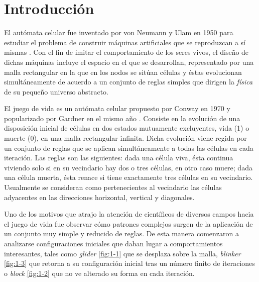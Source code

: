 \documentclass[../proyecto.tex]{book}
\begin{document}
\chapter{Introducción}

El autómata celular fue inventado por von Neumann y Ulam en 1950 para estudiar el problema de construir máquinas artificiales que se reproduzcan a sí mismas \cite{neummanUlam}. Con el fin de imitar el comportamiento de los seres vivos, el diseño de dichas máquinas incluye el espacio en el que se desarrollan, representado por una malla rectangular en la que en los nodos se sitúan células y éstas evolucionan simultáneamente de acuerdo a un conjunto de reglas simples que dirigen la \textit{física} de su pequeño universo abstracto. 

El juego de vida es un autómata celular propuesto por Conway en 1970 y popularizado por Gardner en el mismo año \cite{primerap}. Consiste en la evolución de una disposición inicial de células en dos estados mutuamente excluyentes, vida (1) o muerte (0), en una malla rectangular infinita. Dicha evolución viene regida por un conjunto de reglas que se aplican simultáneamente a todas las células en cada iteración. Las reglas son las siguientes: dada una célula viva, ésta continua viviendo solo si en su vecindario hay dos o tres células, en otro caso muere; dada una célula muerta, ésta renace si tiene exactamente tres células en su vecindario. Usualmente se consideran como pertenecientes al vecindario las células adyacentes en las direcciones horizontal, vertical y diagonales.

Uno de los motivos que atrajo la atención de científicos de diversos campos hacia el juego de vida fue observar cómo patrones complejos surgen de la aplicación de un conjunto muy simple y reducido de reglas. De esta manera comenzaron a analizarse configuraciones iniciales que daban lugar a comportamientos interesantes, tales como \textit{glider} \autoref{fig:1-1} que se desplaza sobre la malla, \textit{blinker} \autoref{fig:1-3} que retorna a su configuración inicial tras un número finito de iteraciones o \textit{block} \autoref{fig:1-2} que no ve alterado su forma en cada iteración.
\end{document}
